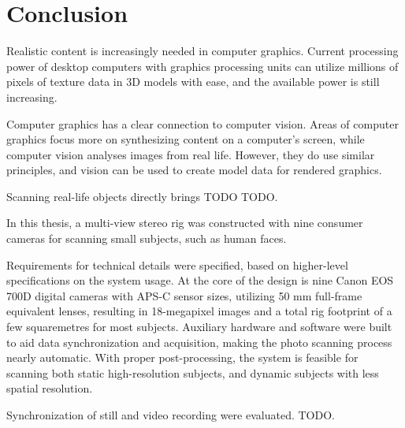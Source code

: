 \section{Conclusion} \label{sec:conclusion} %

Realistic content is increasingly needed in computer graphics.
Current processing power of desktop computers with graphics processing units can utilize millions of pixels of texture data in 3D models with ease, and the available power is still increasing.

Computer graphics has a clear connection to computer vision.
Areas of computer graphics focus more on synthesizing content on a computer's screen, while computer vision analyses images from real life.
However, they do use similar principles, and vision can be used to create model data for rendered graphics.

Scanning real-life objects directly brings TODO TODO.

In this thesis, a multi-view stereo rig was constructed with nine consumer cameras for scanning small subjects, such as human faces.

Requirements for technical details were specified, based on higher-level specifications on the system usage.
At the core of the design is nine Canon EOS 700D digital cameras with APS-C sensor sizes, utilizing 50 mm full-frame equivalent lenses, resulting in 18-megapixel images and a total rig footprint of a few squaremetres for most subjects.
Auxiliary hardware and software were built to aid data synchronization and acquisition, making the photo scanning process nearly automatic.
With proper post-processing, the system is feasible for scanning both static high-resolution subjects, and dynamic subjects with less spatial resolution.

Synchronization of still and video recording were evaluated. TODO.


